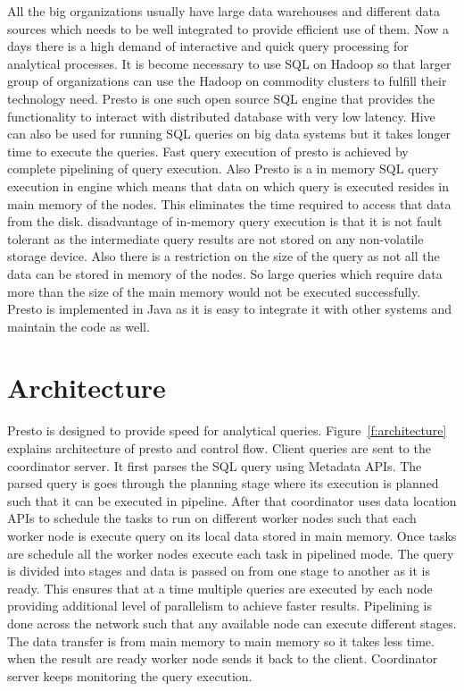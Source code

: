 All the big organizations usually have large data warehouses and different data
sources which needs to be well integrated to provide efficient use of them. Now
a days there is a high demand of interactive and quick query processing for
analytical processes. It is become necessary to use SQL on Hadoop so that
larger group of organizations can use the Hadoop on commodity clusters to
fulfill their technology need. Presto is one such open source SQL engine that
provides the functionality to interact with distributed database with very
low latency.
Hive can also be used for running SQL queries on big data systems but it takes
longer time to execute the queries. Fast query execution of presto is achieved
by complete pipelining of query execution. Also Presto is a in memory SQL query
execution in engine which means that data on which query is executed resides in
main memory of the nodes. This eliminates the time required to access that data
from the disk. disadvantage of in-memory query execution is that it is not
fault tolerant as the intermediate query results are not stored on any
non-volatile storage device. Also there is a restriction on the size of the
query as not all the data can be stored in memory of the nodes. So large
queries which require data more than the size of the main memory would not be
executed successfully.
Presto is implemented in Java as it is easy to integrate it with other systems
and maintain the code as well.

\section{Architecture}

Presto is designed to provide speed for analytical queries.
Figure~\ref{f:architecture} explains architecture of presto and control flow.
Client queries are sent to the coordinator server. It first parses the SQL query
 using Metadata APIs. The parsed query is goes through the planning stage where
 its execution is planned such that it can be executed in pipeline. After that
 coordinator uses data location APIs to schedule the tasks to run on different
 worker nodes such that each worker node is execute query on its local data
 stored in main memory. Once tasks are schedule all the worker nodes execute
 each task in pipelined mode. The query is divided into stages and data is
 passed on from one stage to another as it is ready. This ensures that at a time
  multiple queries are executed by each node providing additional level of
  parallelism to achieve faster results. Pipelining is done across the network
  such that any available node can execute different stages. The data transfer
  is from main memory to main memory so it takes less time. when the result are
  ready worker node sends it back to the client. Coordinator server keeps
  monitoring the query execution.

